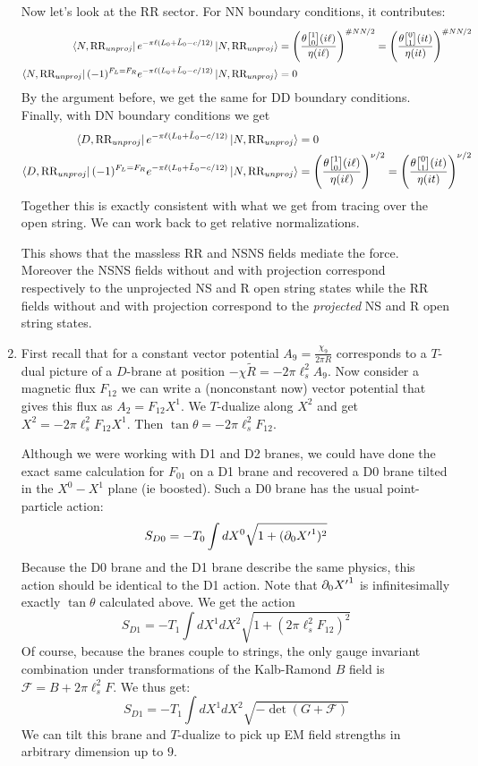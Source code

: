 \documentclass[11pt, class=article, crop=false]{standalone}
\begin{document}
\begin{enumerate}
	Now let's look at the RR sector. For NN boundary conditions, it contributes:
	\[
		\begin{aligned}
			\bra{N, \text{RR}_{unproj}} e^{-\pi \ell (L_0 + \tilde L_0 - c/12)} \ket{N, \text{RR}_{unproj}}  &= \left(\frac{\theta\twist10(i \ell)}{\eta(i \ell)}\right)^{\# NN/2} = \left(\frac{\theta\twist01(it)}{\eta(i t)}\right)^{\# NN/2} \\ 
			\bra{N, \text{RR}_{unproj}} (-1)^{F_L = F_R} e^{-\pi \ell (L_0 + \tilde L_0 - c/12)} \ket{N, \text{RR}_{unproj}}  &= 0
		\end{aligned}
	\]
	By the argument before, we get the same for DD boundary conditions. Finally, with DN boundary conditions we get
	\[
		\begin{aligned}
			\bra{D, \text{RR}_{unproj}} e^{-\pi \ell (L_0 + \tilde L_0 - c/12)} \ket{N, \text{RR}_{unproj}}  &=  0\\
			\bra{D, \text{RR}_{unproj}} (-1)^{F_L = F_R} e^{-\pi \ell (L_0 + \tilde L_0 - c/12)} \ket{N, \text{RR}_{unproj}}  &= \left(\frac{\theta\twist10(i \ell)}{\eta(i \ell)}\right)^{\nu/2} = \left(\frac{\theta\twist01(i t)}{\eta(i t)}\right)^{\nu/2}
		\end{aligned}
	\]
	Together this is exactly consistent with what we get from tracing over the open string. We can work back to get relative normalizations.
	
	This shows that the massless RR and NSNS fields mediate the force. Moreover the NSNS fields without and with projection correspond respectively to the unprojected NS and R open string states while the RR fields without and with projection correspond to the \emph{projected} NS and R open string states.
	
	\item First recall that for a constant vector potential $A_9 = \frac{\chi_9}{2\pi R}$ corresponds to a $T$-dual picture of a $D$-brane at position $- \chi \tilde R = -2 \pi \ell_s^2 A_9$. Now consider a magnetic flux $F_{12}$ we can write a (nonconstant now) vector potential that gives this flux as $A_2 = F_{12} X^1$. We $T$-dualize along $X^2$ and get $X^2 = -2 \pi \ell_s^2 F_{12} X^1$. Then $\tan \theta = -2 \pi \ell_s^2 F_{12}$.
	
	Although we were working with D1 and D2 branes, we could have done the exact same calculation for $F_{01}$ on a D1 brane and recovered a D0 brane tilted in the $X^0-X^1$ plane (ie boosted). Such a D0 brane has the usual point-particle action:
	\[
		S_{D0} = -T_0 \int dX^0 \sqrt{1 + (\partial_0 {X'}^1)^2} 
	\]
	Because the D0 brane and the D1 brane describe the same physics, this action should be identical to the D1 action. Note that $\partial_0 {X'}^1$ is infinitesimally exactly $\tan \theta$ calculated above. We get the action
	\[
		S_{D1} = -T_1 \int dX^1 dX^2 \sqrt{1 + (2\pi \ell_s^2 F_{12})^2} 
	\]
	Of course, because the branes couple to strings, the only gauge invariant combination under transformations of the Kalb-Ramond $B$ field is $\mathcal F = B + 2\pi \ell_s^2 F$. We thus get:
	\[
		S_{D1} = -T_1 \int dX^1 dX^2 \sqrt{- \det (G + \mathcal F)} 
	\]
	We can tilt this brane and $T$-dualize to pick up EM field strengths in arbitrary dimension up to $9$.
	

\end{enumerate}
\end{document}
